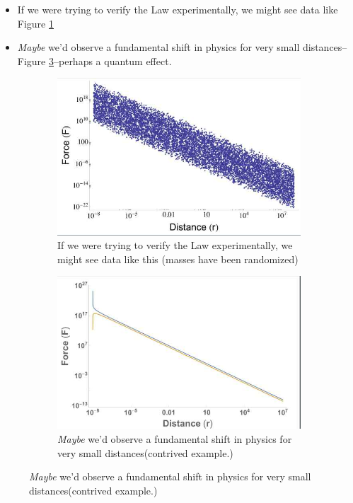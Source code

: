 \documentclass[]{article}
\begin{document}
\begin{itemize}
	\item If we were trying to verify the Law experimentally, we might see data like Figure \ref{fig:Newton:Experimental}
	\item \emph{Maybe} we'd observe a fundamental shift in physics for very small distances--Figure \ref{fig:Newton:Shift}--perhaps a quantum effect. 
\end{itemize}
\begin{figure}[H]
	\caption{Newton's Law of Universal Gravitation}
	\begin{subfigure}[t]{0.45\textwidth}
		\caption{If we were trying to verify the Law experimentally, we might see data like this (masses have been randomized)}\label{fig:Newton:Experimental}
		\includegraphics[width=\textwidth]{Newton}
	\end{subfigure}
	\;\;\;
	\begin{subfigure}[t]{0.45\textwidth}
		\caption{\emph{Maybe} we'd observe a fundamental shift in physics for very small distances(contrived example.)}\label{fig:Newton:Shift}
		\includegraphics[width=\textwidth]{Newton2}
	\end{subfigure}
\end{figure}
\end{document}
